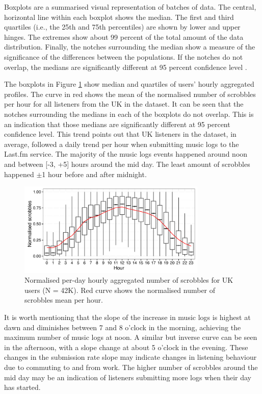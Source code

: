 Boxplots are a summarised visual representation of batches of data. The central, horizontal line within each boxplot shows the median. The first and third quartiles (i.e., the 25th and 75th percentiles) are shown by lower and upper hinges. The extremes show about 99 percent of the total amount of the data distribution. Finally, the notches surrounding the median show a measure of the significance of the differences between the populations. If the notches do not overlap, the medians are significantly different at 95 percent confidence level \autocite{mcgill78variations}. 

The boxplots in Figure \ref{fig:daily_aggregated_UK} show median and quartiles of users' hourly aggregated profiles. The curve in red shows the mean of the normalised number of scrobbles per hour for all listeners from the UK in the dataset.
It can be seen that the notches surrounding the medians in each of the boxplots do not overlap. This is an indication that those medians are significantly different at 95 percent confidence level. This trend points out that UK listeners in the dataset, in average, followed a daily trend per hour when submitting music logs to the Last.fm service. The majority of the music logs events happened around noon and between [-3, +5] hours around the mid day. The least amount of scrobbles happened $\pm$1 hour before and after midnight. 

\begin{figure}[!h]
\vspace{1em}
\centering
\includegraphics[width = 0.80\textwidth]{daily_aggregated_UK.pdf}
\caption[Normalised per-day hourly aggregated number of scrobbles for UK users]{Normalised per-day hourly aggregated number of scrobbles for UK users (N = 42K). Red curve shows the normalised number of scrobbles mean per hour.}
\label{fig:daily_aggregated_UK}
\end{figure}



It is worth mentioning that the slope of the increase in music logs is highest at dawn and diminishes between 7 and 8 o'clock in the morning, achieving the maximum number of music logs at noon. A similar but inverse curve can be seen in the afternoon, with a slope change at about 5 o'clock in the evening. These changes in the submission rate slope may indicate changes in listening behaviour due to commuting to and from work. 
The higher number of scrobbles around the mid day may be an indication of listeners submitting more logs when their day has started.

